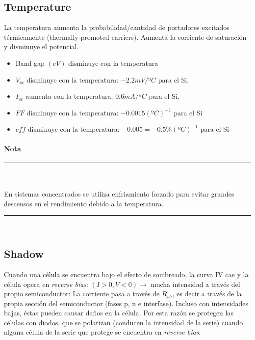
\subsection{Temperature}
La temperatura aumenta la probabilidad/cantidad de portadores excitados térmicamente (thermally-promoted carriers). Aumenta la corriente de saturación y disminuye el potencial.
\begin{itemize}
	\item Band gap $ (eV) $ disminuye con la temperatura
	\item $ V_{oc} $ disminuye con la temperatura: $ -2.2 mV/ºC $ para el Si.
	\item $ I_{sc} $ aumenta con la temperatura: $ 0.6 mA/ºC $ para el Si.
	\item $ FF  $ disminuye con la temperatura: $ - 0.0015 (ºC)^{-1} $ para el Si
	\item $ eff  $ disminuye con la temperatura: $ - 0.005 = - 0.5 \% (ºC)^{-1} $ para el Si
\end{itemize}
{\paragraph{Nota}	
	{\rule{0.9\textwidth}{1pt} \\\\
	En sistemas concentrados se utiliza enfriamiento forzado para evitar grandes descensos en el rendimiento debido a la temperatura.\\
		\rule{0.99\textwidth}{1pt}\\}}

\subsection{Shadow}
Cuando una célula se encuentra bajo el efecto de sombreado, la curva IV cae y la célula opera en {\em reverse bias}: $  (I> 0,  V<0) \rightarrow $ mucha intensidad a través del propio semiconductor: La corriente pasa a través de $ R_{sh} $, es decir a través de la propia sección del semiconductor (fases p, n e interfase). Incluso con intensidades bajas, éstas pueden causar daños en la célula. Por esta razón se protegen las células con diodos, que se polarizan (conducen la intensidad de la serie) cuando alguna célula de la serie que protege se encuentra en {\em reverse bias}.

